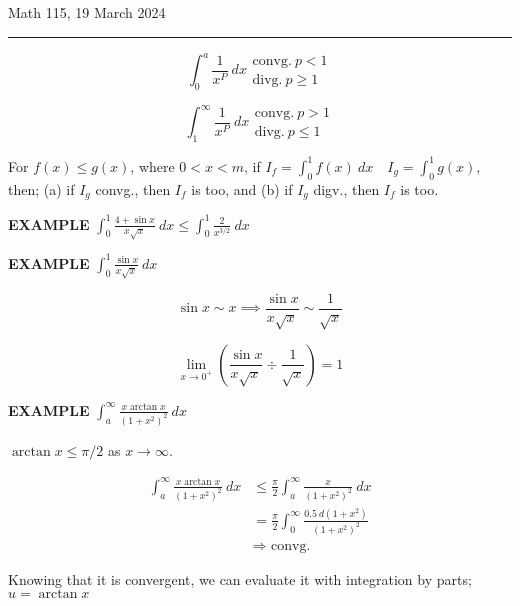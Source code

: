 \documentclass{article}
\begin{document}
Math 115, 19 March 2024
\hrule

\vspace{10pt}

\begin{equation}\boxed{\int_0^a\frac{1}{x^P}\ dx\begin{aligned}\mbox{convg.}\ p<1\\\mbox{divg.}\ p\geq1\end{aligned}}\end{equation}

\begin{equation}\boxed{\int_1^\infty\frac{1}{x^P}\ dx\begin{aligned}\mbox{convg.}\ p>1\\\mbox{divg.}\ p\leq1\end{aligned}}\end{equation}

For $f(x)\leq g(x)$, where $0<x<m$, if $I_f=\int_0^1f(x)\ dx\quad I_g=\int_0^1g(x)$, then; (a) if $I_g$ convg., then $I_f$ is too, and (b) if $I_g$ digv., then $I_f$ is too.

\vspace{10pt}

{\bf{}EXAMPLE} $\int_0^1\frac{4+\sin x}{x\sqrt{x}}\ dx\leq\int_0^1\frac{2}{x^{3/2}}\ dx$

\vspace{10pt}

{\bf{}EXAMPLE} $\int_0^1\frac{\sin x}{x\sqrt x}\ dx$

\[\sin x\sim x\implies\frac{\sin x}{x\sqrt{x}}\sim\frac{1}{\sqrt{x}}\]

\[\lim_{x\to0^+}\left(\frac{\sin x}{x\sqrt{x}}\div\frac{1}{\sqrt{x}}\right)=1\]

{\bf{}EXAMPLE} $\int_a^\infty\frac{x\arctan x}{(1+x^2)^2}\ dx$

\vspace{10pt}

$\arctan x\leq\pi/2$ as $x\to\infty$.

\begin{align*}
\int_a^\infty\frac{x\arctan x}{(1+x^2)^2}\ dx&\leq\frac{\pi}{2}\int_a^\infty\frac{x}{(1+x^2)^2}\ dx\\
&=\frac{\pi}{2}\int_0^\infty\frac{0.5\ d(1+x^2)}{(1+x^2)^2}\\
&\Rightarrow\mbox{ convg.}
\end{align*}

Knowing that it is convergent, we can evaluate it with integration by parts; $u=\arctan x$
\end{document}
